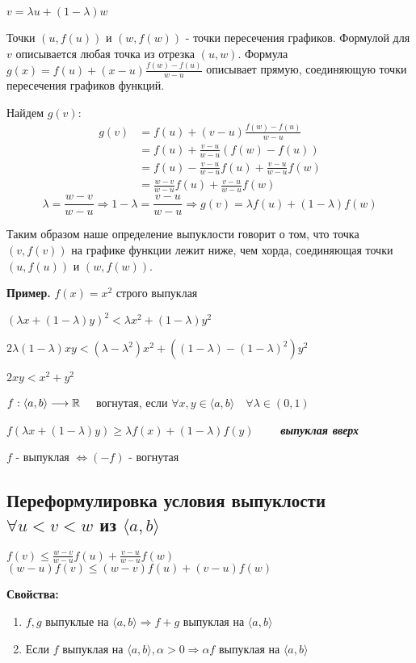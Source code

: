 \begin{conj}
    $v = \lambda u + (1 - \lambda)w$

    Точки $(u, f(u))$ и $(w, f(w))$ - точки пересечения графиков. Формулой для $v$ описывается любая точка 
    из отрезка $(u, w)$. Формула $g(x) = f(u) + (x - u)\frac{f(w) - f(u)}{w - u}$ описывает прямую, соединяющую 
    точки пересечения графиков функций. 
    
    Найдем $g(v)$:
    \begin{equation*}
        \begin{split}
            g(v) &= f(u) + (v - u)\frac{f(w) - f(u)}{w - u} \\
            &= f(u) + \frac{v - u}{w - u}(f(w) - f(u)) \\
            &= f(u) - \frac{v - u}{w - u}f(u) + \frac{v - u}{w - u}f(w) \\
            &= \frac{w - v}{w - u}f(u) + \frac{v - u}{w - u}f(w) 
        \end{split} 
    \end{equation*}
    \[ \lambda = \frac{w - v}{w - u} \Rightarrow 1 - \lambda = \frac{v - u}{w - u} \Rightarrow g(v) = \lambda f(u) + (1 - \lambda)f(w) \]


    Таким образом наше определение выпуклости 
    говорит о том, что точка $(v, f(v))$ на графике функции лежит ниже, чем хорда, соединяющая 
    точки $(u, f(u))$ и $(w, f(w))$.
\end{conj}

\textbf{Пример.} $f(x) = x^2$  строго выпуклая 

$(\lambda x + (1 - \lambda)y)^2 < \lambda x^2 + (1 - \lambda)y^2$

$2 \lambda (1 - \lambda)xy < (\lambda - {\lambda}^2)x^2 + ((1 - \lambda) -
(1 - \lambda)^2)y^2$

$2xy < x^2 + y^2$

\begin{conj}
    $f: \langle a, b \rangle \longrightarrow \mathbb{R} \quad$ вогнутая, если  
    $\forall x, y \in \langle a, b \rangle \quad \forall \lambda \in (0, 1)$

    $f(\lambda x + (1-\lambda)y) \geqslant \lambda f(x) + (1 - \lambda) f(y) \qquad$ \textit{\textbf{выпуклая вверх}}
\end{conj}

\notice $f$ - выпуклая $\Longleftrightarrow (-f)$ - вогнутая

\subsection*{Переформулировка условия выпуклости $\forall u < v < w$ из $\langle a, b \rangle$}

$f(v) \leqslant \frac{w - v}{w - u}f(u) + \frac{v - u}{w - u}f(w)$ \qquad 
$(w - u)f(v) \leqslant (w - v)f(u) + (v - u)f(w)$

\textbf{Свойства: }
\begin{enumerate}
    \item $f, g$ выпуклые на $\langle a, b \rangle \Longrightarrow f + g$ выпуклая на $\langle a, b \rangle$
    \item Если $f$ выпуклая на $\langle a, b \rangle, \alpha > 0 \Longrightarrow \alpha f$ выпуклая на $\langle a, b \rangle$
\end{enumerate}


